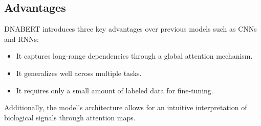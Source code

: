 \subsection{Advantages}

DNABERT introduces three key advantages over previous models such as CNNs and RNNs:
\begin{itemize}
    \item It captures long-range dependencies through a global attention mechanism.
    \item It generalizes well across multiple tasks.
    \item It requires only a small amount of labeled data for fine-tuning.
\end{itemize}

Additionally, the model’s architecture allows for an intuitive interpretation of biological signals through attention maps.